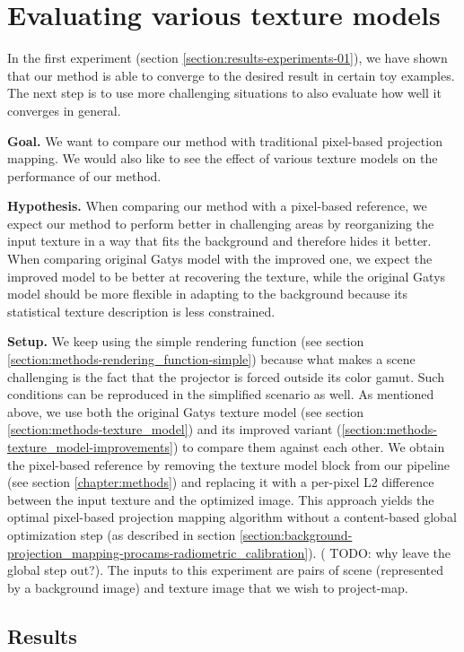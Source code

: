 \section{Evaluating various texture models}
\label{section:results-experiments-02}

In the first experiment (section \ref{section:results-experiments-01}), we have shown that our method is able to converge to the desired result in certain toy examples. The next step is to use more challenging situations to also evaluate how well it converges in general. 

\textbf{Goal.} We want to compare our method with traditional pixel-based projection mapping. We would also like to see the effect of various texture models on the performance of our method.

\textbf{Hypothesis.} When comparing our method with a pixel-based reference, we expect our method to perform better in challenging areas by reorganizing the input texture in a way that fits the background and therefore hides it better. When comparing original Gatys model with the improved one, we expect the improved model to be better at recovering the texture, while the original Gatys model should be more flexible in adapting to the background because its statistical texture description is less constrained.

\textbf{Setup.} We keep using the simple rendering function (see section \ref{section:methods-rendering_function-simple}) because what makes a scene challenging is the fact that the projector is forced outside its color gamut. Such conditions can be reproduced in the simplified scenario as well. As mentioned above, we use both the original Gatys texture model (see section \ref{section:methods-texture_model}) and its improved variant (\ref{section:methods-texture_model-improvements}) to compare them against each other. We obtain the pixel-based reference by removing the texture model block from our pipeline (see section \ref{chapter:methods}) and replacing it with a per-pixel L2 difference between the input texture and the optimized image. This approach yields the optimal pixel-based projection mapping algorithm without a content-based global optimization step (as described in section \ref{section:background-projection_mapping-procams-radiometric_calibration}). ({\color{red} TODO: why leave the global step out?}). The inputs to this experiment are pairs of scene (represented by a background image) and texture image that we wish to project-map.

\subsection{Results}
\label{section:results-experiments-02-results}


